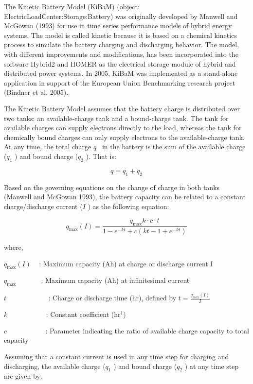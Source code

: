 The Kinetic Battery Model (KiBaM) (object: ElectricLoadCenter:Storage:Battery) was originally developed by Manwell and McGowan (1993) for use in time series performance models of hybrid energy systems. The model is called kinetic because it is based on a chemical kinetics process to simulate the battery charging and discharging behavior. The model, with different improvements and modifications, has been incorporated into the software Hybrid2 and HOMER as the electrical storage module of hybrid and distributed power systems. In 2005, KiBaM was implemented as a stand-alone application in support of the European Union Benchmarking research project (Bindner et al. 2005).

The Kinetic Battery Model assumes that the battery charge is distributed over two tanks: an available-charge tank and a bound-charge tank. The tank for available charges can supply electrons directly to the load, whereas the tank for chemically bound charges can only supply electrons to the available-charge tank. At any time, the total charge \(q\) ~in the battery is the sum of the available charge (\({q_1}\) ) and bound charge (\({q_2}\) ). That is:

\begin{equation}
q = {q_1} + {q_2}
\end{equation}

Based on the governing equations on the change of charge in both tanks (Manwell and McGowan 1993), the battery capacity can be related to a constant charge/discharge current (\(I\) ) as the following equation:

\begin{equation}
{q_{\max }}(I) = \frac{{{q_{\max }}k \cdot c \cdot t}}{{1 - {e^{ - kt}} + c(kt - 1 + {e^{ - kt}})}}
\end{equation}

where,

\({q_{\max }}(I)\) ~ : Maximum capacity (Ah) at charge or discharge current I

\({q_{\max }}\) ~~~~~~ : Maximum capacity (Ah) at infinitesimal current

\(t\) ~~~~~~~~~~~ : Charge or discharge time (hr), defined by \(t = \frac{{{q_{\max }}(I)}}{I}\)

\(k\) ~~~~~~~~~~ : Constant coefficient (hr\(^{1}\))

\(c\) ~~~~~~~~~~ : Parameter indicating the ratio of available charge capacity to total capacity

Assuming that a constant current is used in any time step for charging and discharging, the available charge (\({q_1}\) ) and bound charge (\({q_2}\) ) at any time step are given by:

